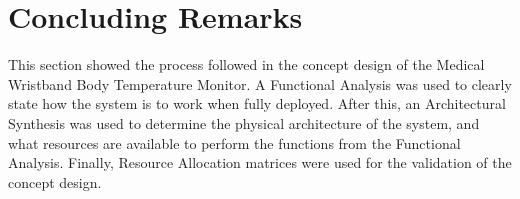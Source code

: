 \section{Concluding Remarks}
This section showed the process followed in the concept design of the Medical Wristband Body Temperature Monitor. A Functional Analysis was used to clearly state how the system is to work when fully deployed. After this, an Architectural Synthesis was used to determine the physical architecture of the system, and what resources are available to perform the functions from the Functional Analysis. Finally, Resource Allocation matrices were used for the validation of the concept design. 